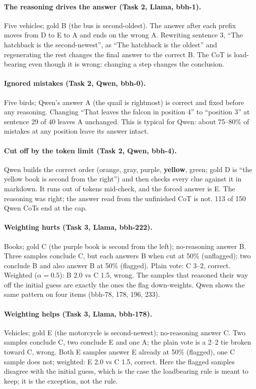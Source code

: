 \documentclass[11pt,a4paper]{article}
\begin{document}
\paragraph{The reasoning drives the answer (Task 2, Llama, bbh-1).} Five vehicles; gold B (the bus is second-oldest). The
answer after each prefix moves from D to E to A and ends on the wrong A. Rewriting sentence 3, ``The hatchback is the
second-newest'', as ``The hatchback is the oldest'' and regenerating the rest changes the final answer to the correct B.
The CoT is load-bearing even though it is wrong: changing a step changes the conclusion.

\paragraph{Ignored mistakes (Task 2, Qwen, bbh-0).} Five birds; Qwen's answer A (the quail is rightmost) is correct and
fixed before any reasoning. Changing ``That leaves the falcon in position 4'' to ``position 3'' at sentence 29 of 40 leaves
A unchanged. This is typical for Qwen: about 75--80\% of mistakes at any position leave its answer intact.

\paragraph{Cut off by the token limit (Task 2, Qwen, bbh-4).} Qwen builds the correct order (orange, gray, purple,
\textbf{yellow}, green; gold D is ``the yellow book is second from the right'') and then checks every clue against it in
markdown. It runs out of tokens mid-check, and the forced answer is E. The reasoning was right; the answer read from the
unfinished CoT is not. 113 of 150 Qwen CoTs end at the cap.

\paragraph{Weighting hurts (Task 3, Llama, bbh-222).} Books; gold C (the purple book is second from the left);
no-reasoning answer B. Three samples conclude C, but each answers B when cut at 50\% (unflagged); two conclude B and also
answer B at 50\% (flagged). Plain vote: C 3--2, correct. Weighted ($\alpha=0.5$): B 2.0 vs C 1.5, wrong. The samples that
reasoned their way off the initial guess are exactly the ones the flag down-weights. Qwen shows the same pattern on four
items (bbh-78, 178, 196, 233).

\paragraph{Weighting helps (Task 3, Llama, bbh-178).} Vehicles; gold E (the motorcycle is second-newest); no-reasoning answer
C. Two samples conclude C, two conclude E and one A; the plain vote is a 2--2 tie broken toward C, wrong. Both E samples
answer E already at 50\% (flagged), one C sample does not; weighted: E 2.0 vs C 1.5, correct. Here the flagged samples
disagree with the initial guess, which is the case the loadbearing rule is meant to keep; it is the exception, not the rule.
\end{document}
